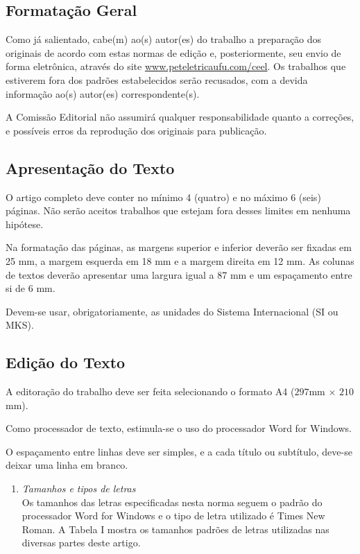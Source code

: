 \documentclass{ceel}
\begin{document}
\begin{multicols}{2}
\section{Formatação Geral}
Como já salientado, cabe(m) ao(s) autor(es) do trabalho a preparação dos originais de acordo com estas normas de edição e, posteriormente, seu envio de forma eletrônica, através do site \url{www.peteletricaufu.com/ceel}. Os trabalhos que estiverem fora dos padrões estabelecidos serão recusados, com a devida informação ao(s) autor(es) correspondente(s).

A Comissão Editorial não assumirá qualquer responsabilidade quanto a correções, e possíveis erros da reprodução dos originais para publicação.

\subsection{Apresentação do Texto}
O artigo completo deve conter no mínimo 4 (quatro) e no máximo 6 (seis) páginas. Não serão aceitos trabalhos que estejam fora desses limites em nenhuma hipótese. 

Na formatação das páginas, as margens superior e inferior deverão ser fixadas em 25 mm, a margem esquerda em 18 mm e a margem direita em 12 mm. As colunas de textos deverão apresentar uma largura igual a 87 mm e um espaçamento entre si de 6 mm.

Devem-se usar, obrigatoriamente, as unidades do Sistema Internacional (SI ou MKS).

\subsection{Edição do Texto}
A editoração do trabalho deve ser feita selecionando o formato A4 ($297$mm $\times$ $210$mm).

Como processador de texto, estimula-se o uso do processador Word for Windows. 

O espaçamento entre linhas deve ser simples, e a cada título ou subtítulo, deve-se deixar uma linha em branco.


\begin{enumerate}[1)]
\item \emph{Tamanhos e tipos de letras}\\
Os tamanhos das letras especificadas nesta norma seguem o padrão do processador Word for Windows e o tipo de letra utilizado é Times New Roman. A Tabela I mostra os tamanhos padrões de letras utilizadas nas diversas partes deste artigo. 


\end{enumerate}
\end{multicols}
\end{document}
